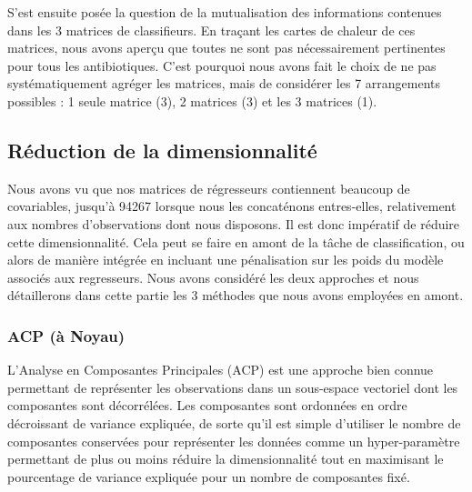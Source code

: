 \documentclass[11pt]{article}
\begin{document}
  S'est ensuite posée la question de la mutualisation des informations contenues dans les 3 matrices de classifieurs.
  En traçant les cartes de chaleur de ces matrices, nous avons aperçu que toutes ne sont pas nécessairement pertinentes pour tous les antibiotiques.
  C'est pourquoi nous avons fait le choix de ne pas systématiquement agréger les matrices, mais de considérer les 7 arrangements possibles : 1 seule matrice (3), 2 matrices (3) et les 3 matrices (1).

\hypertarget{reduction-dimension}{%
\subsection{Réduction de la dimensionnalité}\label{reduction-dimension}}

  Nous avons vu que nos matrices de régresseurs contiennent beaucoup de covariables, jusqu'à 94267 lorsque nous les concaténons entres-elles, relativement aux nombres d'observations dont nous disposons.
  Il est donc impératif de réduire cette dimensionnalité.
  Cela peut se faire en amont de la tâche de classification, ou alors de manière intégrée en incluant une pénalisation sur les poids du modèle associés aux regresseurs.
  Nous avons considéré les deux approches et nous détaillerons dans cette partie les 3 méthodes que nous avons employées en amont.

\hypertarget{acp-noyau}{%
\subsubsection{ACP (à Noyau)}\label{acp-noyau}}

  L'Analyse en Composantes Principales (ACP) est une approche bien connue permettant de représenter les observations dans un sous-espace vectoriel dont les composantes sont décorrélées.
  Les composantes sont ordonnées en ordre décroissant de variance expliquée, de sorte qu'il est simple d'utiliser le nombre de composantes conservées pour représenter les données comme un hyper-paramètre permettant de plus ou moins réduire la dimensionnalité tout en maximisant le pourcentage de variance expliquée pour un nombre de composantes fixé.
\end{document}
